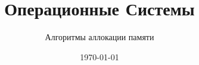 \documentclass[12pt,t]{beamer}
\title{Операционные Системы}
\subtitle{Алгоритмы аллокации памяти}
\date{\today}
\begin{document}
  \begin{frame}
    \titlepage
  \end{frame}
  
  
  
\end{document}
